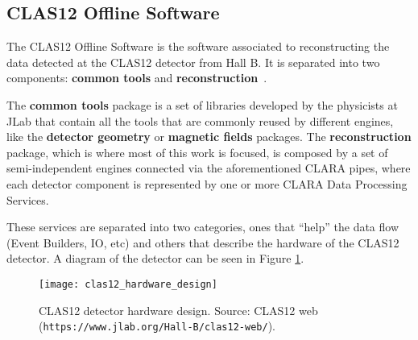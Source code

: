 \subsection{CLAS12 Offline Software} \label{ssec:framework_clas12}

The CLAS12 Offline Software is the software associated to reconstructing the data detected at the CLAS12 detector from Hall B.
It is separated into two components: \textbf{common tools} and \textbf{reconstruction}~\cite{ziegler2013clas12}.

The \textbf{common tools} package is a set of libraries developed by the physicists at JLab that contain all the tools that are commonly reused by different engines, like the \textbf{detector geometry} or \textbf{magnetic fields} packages.
The \textbf{reconstruction} package, which is where most of this work is focused, is composed by a set of semi-independent engines connected via the aforementioned CLARA pipes, where each detector component is represented by one or more CLARA Data Processing Services.

These services are separated into two categories, ones that ``help'' the data flow (Event Builders, IO, etc) and others that describe the hardware of the CLAS12 detector.
A diagram of the detector can be seen in Figure \ref{fig:clas12_hardware_design}.

    \begin{figure}[h]
        \centering
        \texttt{[image: clas12\_hardware\_design]}
        \caption{\label{fig:clas12_hardware_design} CLAS12 detector hardware design. Source: CLAS12 web (\texttt{https://www.jlab.org/Hall-B/clas12-web/}).}
    \end{figure}

\newpage

